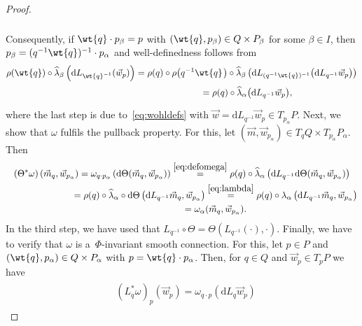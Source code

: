 \begin{proof}
\begin{gather}
\begin{split}
\end{split}
\label{eq:thirdstep}
\end{gather}
Consequently, if $\wt{q}\cdot p_\beta=p$ with $(\wt{q},p_\beta)\in Q\times P_\beta$ for some $\beta \in I$, then
$p_\beta=(q^{-1}\wt{q})^{-1}\cdot p_\alpha$ and well-def\/inedness follows from
\begin{gather*}
\rho(\wt{q})\circ \widehat{\lambda}_\beta\left(\mathrm{d}
L_{{\wt{q}}^{-1}}(\vec{w}_p)\right)=\rho(q)\circ\rho\big(q^{-1}\wt{q}\hspace{1pt}\big)\circ\widehat{\lambda}_\beta\left(\mathrm{d}
L_{(q^{-1}\wt{q})^{-1}}\big( \mathrm{d} L_{q^{-1}}\vec{w}_p\big)\right)
\\
\phantom{\rho(\wt{q})\circ \widehat{\lambda}_\beta\left(\mathrm{d}
L_{{\wt{q}}^{-1}}(\vec{w}_p)\right)}
{} =\rho(q)\circ \widehat{\lambda}_\alpha\big(\mathrm{d} L_{q^{-1}}\vec{w}_p\big),
\end{gather*}
where the last step is due to~\eqref{eq:wohldefs} with $\vec{w}=\mathrm{d} L_{q^{-1}}\vec{w}_p\in T_{p_\alpha}P$.
Next, we show that $\omega$ fulf\/ils the pullback property.
For this, let $(\vec{m},\vec{w}_{p_\alpha})\in T_qQ\times T_{p_\alpha}P_\alpha$.
Then
\begin{gather*}
(\Theta^{*}\omega)\left(\vec{m}_q,\vec{w}_{p_\alpha}\right)
=\omega_{q\cdot p_\alpha}\left(\mathrm{d}\Theta(\vec{m}_q,\vec{w}_{p_\alpha})\right) \stackrel{\eqref{eq:defomega}}{=}\rho(q)\circ
\widehat{\lambda}_\alpha\left(\mathrm{d} L_{q^{-1}}\mathrm{d}\Theta(\vec{m}_q,\vec{w}_{p_\alpha})\right)
\\
\phantom{(\Theta^{*}\omega)\left(\vec{m}_q,\vec{w}_{p_\alpha}\right)}
=\rho(q)\circ \widehat{\lambda}_\alpha\circ \mathrm{d}\Theta\left(\mathrm{d} L_{q^{-1}}
\vec{m}_q,\vec{w}_{p_\alpha}\right) \stackrel{\eqref{eq:lambda}}{=}\rho(q)\circ \lambda_\alpha\left(\mathrm{d}
L_{q^{-1}} \vec{m}_q,\vec{w}_{p_\alpha}\right)
\\
\phantom{(\Theta^{*}\omega)\left(\vec{m}_q,\vec{w}_{p_\alpha}\right)}
=\omega_\alpha(\vec{m}_q,\vec{w}_{p_\alpha}).
\end{gather*}
In the third step, we have used that $L_{q^{-1}}\circ \Theta= \Theta(L_{q^{-1}}(\cdot),\cdot)$.
Finally, we have to verify that $\omega$ is a~$\Phi$-invariant smooth connection.
For this, let $p\in P$ and $(\wt{q},p_\alpha)\in Q\times P_\alpha$ with $p=\wt{q}\cdot p_\alpha$.
Then, for $q\in Q$ and $\vec{w}_p\in T_pP$ we have
\begin{gather*}
\begin{split}
&\left(L_q^{*}\omega\right)_{p}(\vec{w}_{p})=\omega_{q\cdot p}\left(\mathrm{d} L_q \vec{w}_{p}\right)

\end{split}
\end{gather*}
\end{proof}
